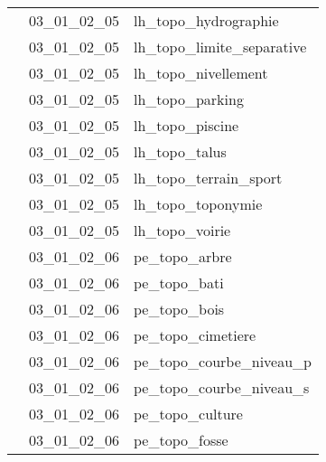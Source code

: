 \documentclass[12pt,titlepage,oneside]{book}
\begin{document}
\begin{supertabular}{|p{10cm}|c|p{15cm}|}
                    & 03\_01\_02\_05 & lh\_topo\_hydrographie\\


                    & 03\_01\_02\_05 & lh\_topo\_limite\_separative\\


                    & 03\_01\_02\_05 & lh\_topo\_nivellement\\


                    & 03\_01\_02\_05 & lh\_topo\_parking\\


                    & 03\_01\_02\_05 & lh\_topo\_piscine\\


                    & 03\_01\_02\_05 & lh\_topo\_talus\\


                    & 03\_01\_02\_05 & lh\_topo\_terrain\_sport\\


                    & 03\_01\_02\_05 & lh\_topo\_toponymie\\


                    & 03\_01\_02\_05 & lh\_topo\_voirie\\


                    & 03\_01\_02\_06 & pe\_topo\_arbre\\


                    & 03\_01\_02\_06 & pe\_topo\_bati\\


                    & 03\_01\_02\_06 & pe\_topo\_bois\\


                    & 03\_01\_02\_06 & pe\_topo\_cimetiere\\


                    & 03\_01\_02\_06 & pe\_topo\_courbe\_niveau\_p\\


                    & 03\_01\_02\_06 & pe\_topo\_courbe\_niveau\_s\\


                    & 03\_01\_02\_06 & pe\_topo\_culture\\


                    & 03\_01\_02\_06 & pe\_topo\_fosse\\



\end{supertabular}
\end{document}
